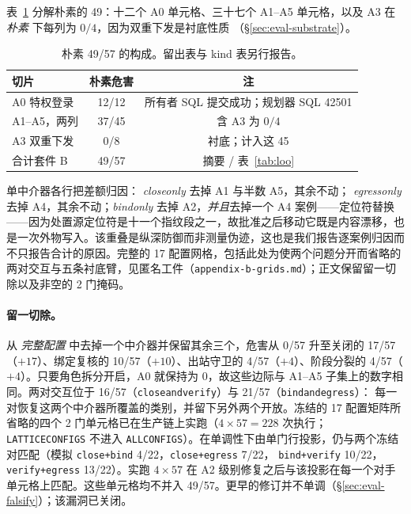 \documentclass[acmsmall,manuscript,review,anonymous]{acmart}
\renewcommand{\_}{\discretionary{\textunderscore}{}{\textunderscore}}
\begin{document}
表~\ref{tab:suiteb-decomp} 分解朴素的 49：十二个 A0 单元格、三十七个 A1--A5 单元格，以及 {A3} 在 \emph{朴素} 下每列为 $0/4$，因为双重下发是衬底性质
（\S\ref{sec:eval-substrate}）。

\begin{table}[t]
\centering
\small
\caption{朴素 49/57 的构成。留出表与 kind 表另行报告。}
\label{tab:suiteb-decomp}
\begin{tabular}{@{}lcc@{}}
\hline
切片 & 朴素危害 & 注 \\
\hline
A0 特权登录 & 12/12 & 所有者 {SQL} 提交成功；规划器 {SQL} 42501 \\
A1--A5，两列 & 37/45 & 含 {A3} 为 $0/4$ \\
A3 双重下发 & 0/8 & 衬底；计入这 45 \\
\hline
合计套件 B & 49/57 & 摘要 / 表~\ref{tab:loo} \\
\hline
\end{tabular}
\end{table}

单中介器各行把差额归因：
\emph{close\_only} 去掉 A1 与半数 A5，其余不动；
\emph{egress\_only} 去掉 A4，其余不动；\emph{bind\_only} 去掉
A2，\emph{并且}去掉一个 A4 案例——定位符替换——因为处置源定位符是十一个指纹段之一，故批准之后移动它既是内容漂移，也是一次外物写入。该重叠是纵深防御而非测量伪迹，这也是我们报告逐案例归因而不只报告合计的原因。完整的 17 配置网格，包括此处为使两个问题分开而省略的两对交互与五条衬底臂，见匿名工件（\texttt{appendix-b-grids.md}）；正文保留留一切除以及非空的 2 门掩码。

\paragraph{留一切除。}
从 \emph{完整配置} 中去掉一个中介器并保留其余三个，危害从 0/57 升至关闭的 17/57（$+17$）、绑定复核的 10/57（$+10$）、出站守卫的 4/57（$+4$）、阶段分裂的 4/57（$+4$）。只要角色拆分开启，A0 就保持为 0，故这些边际与 A1--A5 子集上的数字相同。两对交互位于
16/57（\texttt{close\_and\_verify}）与 21/57（\texttt{bind\_and\_egress}）：
每一对恢复这两个中介器所覆盖的类别，并留下另外两个开放。冻结的 17 配置矩阵所省略的四个 2 门单元格已在生产链上实跑（$4\times 57=228$ 次执行；
\texttt{LATTICE\_CONFIGS} 不进入 \texttt{ALL\_CONFIGS}）。在单调性下由单门行投影，仍与两个冻结对匹配（模拟 \texttt{close+bind} 4/22，\texttt{close+egress} 7/22，
\texttt{bind+verify} 10/22，\texttt{verify+egress} 13/22）。实跑
$4\times 57$ 在 A2 级别修复之后与该投影在每一个对手单元格上匹配。这些单元格均不并入 49/57。更早的修订并不单调（\S\ref{sec:eval-falsify}）；该漏洞已关闭。
\end{document}
